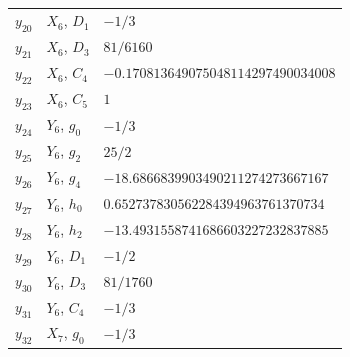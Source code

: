 \documentclass[12pt]{article}
\begin{document}
\begin{table}[H]
\begin{tabular}{lll}
$y_{20}$ & $X_{6}$, $D_{1}$ & $-1/3$ \\
$y_{21}$ & $X_{6}$, $D_{3}$ & $81/6160$ \\
$y_{22}$ & $X_{6}$, $C_{4}$ & $-0.170813649075048114297490034008$ \\
$y_{23}$ & $X_{6}$, $C_{5}$ & $1$ \\
$y_{24}$ & $Y_{6}$, $g_{0}$ & $-1/3$ \\
$y_{25}$ & $Y_{6}$, $g_{2}$ & $25/2$ \\
$y_{26}$ & $Y_{6}$, $g_{4}$ & $-18.6866839903490211274273667167$ \\
$y_{27}$ & $Y_{6}$, $h_{0}$ & $0.652737830562284394963761370734$ \\
$y_{28}$ & $Y_{6}$, $h_{2}$ & $-13.4931558741686603227232837885$ \\
$y_{29}$ & $Y_{6}$, $D_{1}$ & $-1/2$ \\
$y_{30}$ & $Y_{6}$, $D_{3}$ & $81/1760$ \\
$y_{31}$ & $Y_{6}$, $C_{4}$ & $-1/3$ \\
$y_{32}$ & $X_{7}$, $g_{0}$ & $-1/3$ \\ \hline
\end{tabular}
\end{table}
\end{document}
